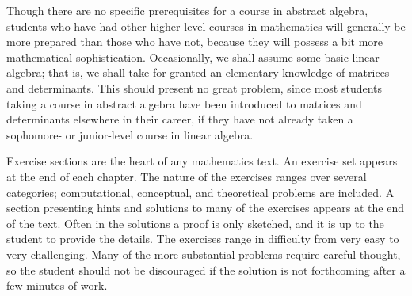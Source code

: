 \begin{figure}[htb]
\begin{center}

\end{center}
\end{figure}

 
 
Though there are no specific prerequisites for a course in abstract
algebra, students who have had other higher-level courses in
mathematics will generally be more prepared than those who have not,
because they will possess a bit more mathematical sophistication.
Occasionally, we shall assume some basic linear algebra; that is, we
shall take for granted an elementary knowledge of matrices and
determinants. This should present no great problem, since most
students taking a course in abstract algebra have been introduced to
matrices and determinants elsewhere in their career, if they have not
already taken a sophomore- or junior-level course in linear algebra.   
 
 

 
Exercise sections are the heart of any mathematics text. An exercise
set appears at the end of each chapter. The nature of the exercises
ranges over several categories; computational,  conceptual, and
theoretical problems are included. A section presenting hints and
solutions to many of the exercises appears at the end of the text.
Often in the solutions a proof is only sketched, and it is up to the
student to provide the details. The exercises range in difficulty from
very easy to very challenging. Many of the more substantial problems
require careful thought, so the student should not be discouraged if
the solution is not forthcoming after a few minutes of work. 


